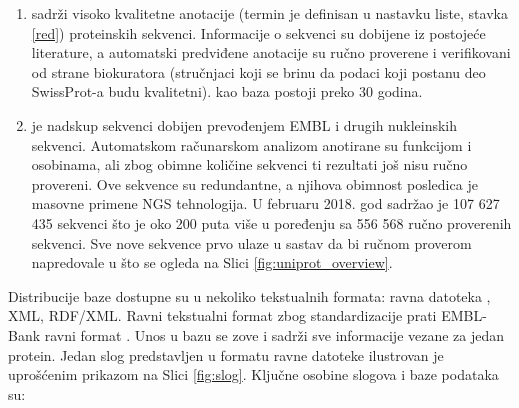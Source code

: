 \begin{enumerate}
  \item \keyword{\swissprot}  sadrži visoko kvalitetne anotacije
     (termin je definisan u nastavku liste,
    stavka \ref{red}) proteinskih sekvenci.  Informacije o sekvenci su dobijene
    iz postojeće literature, a automatski predviđene anotacije su ručno
    proverene i verifikovani od strane biokuratora (stručnjaci koji se brinu da
    podaci koji postanu deo SwissProt-a budu kvalitetni).  \swissprot kao baza
    postoji preko 30 godina.

  \item \trembl {} je nadskup \swissprot sekvenci 
    dobijen prevođenjem EMBL i drugih nukleinskih sekvenci. Automatskom
    računarskom analizom anotirane su funkcijom i osobinama, ali zbog obimne
    količine sekvenci ti rezultati još nisu ručno provereni.  Ove sekvence su
    redundantne, a njihova obimnost posledica je masovne primene NGS
    tehnologija. U februaru 2018. god \trembl sadržao je 107 627 435 sekvenci
    što je oko 200 puta više u poređenju sa 556 568 ručno proverenih \swissprot
    sekvenci. Sve nove sekvence prvo ulaze u sastav \trembl da bi ručnom
    proverom napredovale u \swissprot što se ogleda na Slici
    \ref{fig:uniprot_overview}.
\end{enumerate}





Distribucije \swissprot baze dostupne su u nekoliko tekstualnih formata: ravna
datoteka , XML, RDF/XML.  Ravni tekstualni format zbog
standardizacije prati EMBL-Bank ravni format \parencite{svisprot2003}.
Unos u bazu se zove   i sadrži sve informacije vezane
za jedan protein.  Jedan slog predstavljen u formatu ravne datoteke ilustrovan
je uprošćenim prikazom  na Slici \ref{fig:slog}.  Ključne osobine slogova i
\swissprot baze podataka su:


